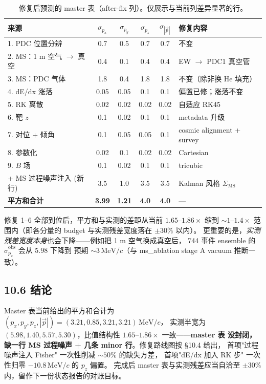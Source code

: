 \begin{table}[ht]
  \centering\footnotesize
  \caption{修复后预测的 master 表（after-fix 列）。仅展示与当前列差异显著的行。}
  \label{tab:partIIc:budget:after-fix}
  \begin{tabular}{l|cccc|l}
    \hline
    来源 & $\sigma_{p_x}$ & $\sigma_{p_y}$ & $\sigma_{p_z}$ & $\sigma_{|\vec p|}$ & 修复内容 \\
    \hline
    1. PDC 位置分辨                & 0.7 & 0.5 & 0.7 & 0.7 & 不变 \\
    2. MS：1 m 空气 $\to$ 真空     & 0.4 & 0.1 & 0.4 & 0.4 & EW $\to$ PDC1 真空管 \\
    3. MS：PDC 气体                & 1.8 & 0.4 & 1.8 & 1.8 & 不变（除非换 He 填充） \\
    4. dE/dx 涨落                  & 0.05 & 0.05 & 0.1 & 0.1 & 偏置已修；涨落不变 \\
    5. RK 离散                     & 0.02 & 0.02 & 0.02 & 0.02 & 自适应 RK45 \\
    6. 靶 $z$                      & 0.1 & 0.02 & 0.1 & 0.1 & metadata 升级 \\
    7. 对位 + 倾角                 & 0.1 & 0.05 & 0.05 & 0.1 & cosmic alignment + survey \\
    8. 参数化                      & 0.02 & 0.1 & 0.02 & 0.02 & Cartesian \\
    9. $B$ 场                      & 0.1 & 0.02 & 0.1 & 0.1 & tricubic \\
    + MS 过程噪声注入 (新行)        & 3.5 & 1.0 & 3.5 & 3.5 & Kalman 风格 $\Sigma_\mathrm{MS}$ \\
    \hline
    \textbf{平方和合计} & \textbf{3.99} & \textbf{1.21} & \textbf{4.0} & \textbf{4.0} & --- \\
    \hline
  \end{tabular}
\end{table}

修复 1--6 全部到位后，平方和与实测的差距从当前 $1.65$--$1.86\times$ 缩到
$\sim 1\text{--}1.4\times$ 范围内（即各分量的 budget 与实测残差宽度落在 $\pm 30\%$ 以内）。
更重要的是，\emph{实测残差宽度本身}也会下降——例如把 1 m 空气换成真空后，
744 事件 ensemble 的 $\widehat\sigma_{p_x}^\mathrm{obs}$ 会从 $5.98$ 下降到
预期 $\sim 3\,\mathrm{MeV}/c$（与 ms\_ablation stage A vacuum 推断一致）。

\subsection*{10.6 结论}

Master 表当前给出的平方和合计为 $(p_x, p_y, p_z, |\vec p|) = (3.21, 0.85, 3.21, 3.21)\,\mathrm{MeV}/c$，
实测半宽为 $(5.98, 1.40, 5.57, 5.30)$，比值结构性 $1.65$--$1.86\times$ 一致——\textbf{master 表
没封闭，缺一行 MS 过程噪声 + 几条 minor 行}。修复路线图按 §10.4 给出，
首项"过程噪声注入 Fisher" 一次性削减 $\sim 50\%$ 的缺失方差，
首项"dE/dx 加入 RK 步" 一次性归零 $-10.8\,\mathrm{MeV}/c$ 的 $p_z$ 偏置。
完成后 master 表与实测残差应当自洽至 $\pm 30\%$ 内，留作下一份状态报告的对账目标。
